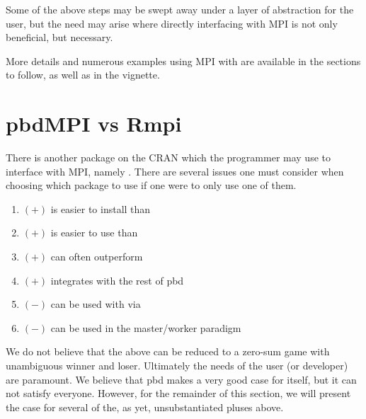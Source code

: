 Some of the above steps may be swept away under a layer of abstraction for the user, but the need may arise where directly interfacing with MPI is not only beneficial, but necessary.

More details and numerous examples using MPI with  are available in the sections to follow, as well as in the  vignette.




\section{pbdMPI vs Rmpi}

There is another package on the CRAN which the  programmer may use to interface with MPI, namely  \citep{Rmpi}.  There are several issues one must consider when choosing which package to use if one were to only use one of them.
\begin{enumerate}
 \item $(+)$  is easier to install than 
 \item $(+)$  is easier to use than 
 \item\label{enum:perf} $(+)$  can often outperform 
 \item\label{enum:integrate} $(+)$  integrates with the rest of pbd
 \item\label{enum:dompi} $(-)$  can be used with  \citep{foreach} via  \citep{dompi}
 \item $(-)$  can be used in the master/worker paradigm
\end{enumerate}

We do not believe that the above can be reduced to a zero-sum game with unambiguous winner and loser.  Ultimately the needs of the user (or developer) are paramount.  We believe that pbd makes a very good case for itself, but it can not satisfy everyone.  However, for the remainder of this section, we will present the case for several of the, as yet, unsubstantiated pluses above.

